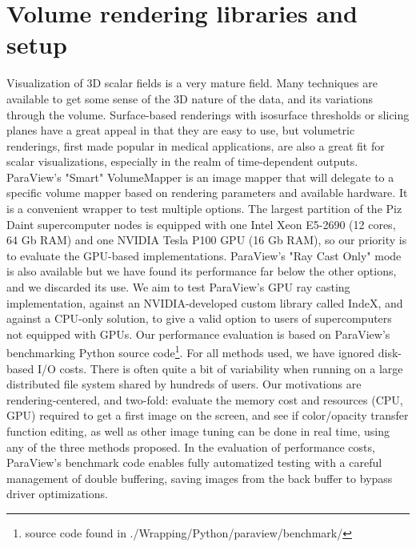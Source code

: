 \documentclass[final,5p,times,twocolumn]{elsarticle}
\begin{document}
\section{Volume rendering libraries and setup}

Visualization of 3D scalar fields is a very mature field. Many techniques are
available to get some sense of the 3D nature of the data, and its variations
through the volume. Surface-based renderings with isosurface thresholds or
slicing planes have a great appeal in that they are easy to use, but volumetric
renderings, first made popular in medical applications, are also a great fit for
scalar visualizations, especially in the realm of time-dependent outputs.
\newline
ParaView's "Smart" VolumeMapper is an image mapper
that will delegate to a specific volume mapper based on rendering parameters and
available hardware. It is a convenient
wrapper to test multiple options.
\newline
The largest partition of the Piz Daint supercomputer
nodes is equipped with one Intel Xeon E5-2690 (12 cores, 64 Gb RAM) and one NVIDIA
Tesla P100 GPU (16 Gb RAM), so our priority is to evaluate the GPU-based implementations.
ParaView's "Ray Cast Only" mode is also available but we have found its performance far
below the other options, and we discarded its use. We aim to test ParaView's GPU
ray casting implementation, against an NVIDIA-developed custom library called
IndeX, and against a CPU-only solution, to give a valid option to users of
supercomputers not equipped with GPUs.
Our performance evaluation is based on ParaView's benchmarking Python source
code\footnote{source code found in ./Wrapping/Python/paraview/benchmark/}.
\newline
For all methods used, we have ignored disk-based I/O costs. There is often quite
a bit of variability when running on a large distributed file system shared by
hundreds of users. Our motivations are rendering-centered, and two-fold:
evaluate the memory cost and resources (CPU, GPU) required to get a first image
on the screen, and see if color/opacity transfer
function editing, as well as other image tuning can be done in real time, using
any of the three methods proposed. In the evaluation of performance costs, ParaView's
benchmark code enables fully automatized testing with a careful management of
double buffering, saving images from the back buffer to bypass driver optimizations.
\end{document}
